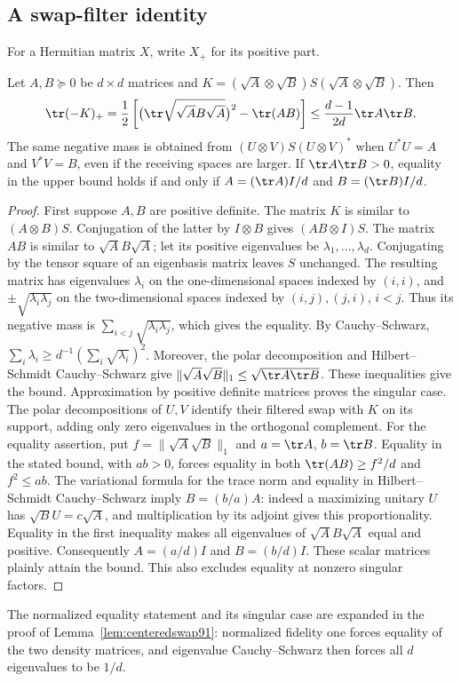 \subsection{A swap-filter identity}
For a Hermitian matrix $X$, write $X_+$ for its positive part.
\begin{lemma}\label{lem:swapfilter90}
Let $A,B\succeq0$ be $d\times d$ matrices and
$K=(\sqrt A\otimes\sqrt B)S(\sqrt A\otimes\sqrt B)$.  Then
\begin{equation}\label{eq:swapfilter90}
 \tr(-K)_+=\frac12\left[
  \bigl(\tr\sqrt{\sqrt A B\sqrt A}\bigr)^2-\tr(AB)\right]
 \le\frac{d-1}{2d}\tr A\tr B.
\end{equation}
The same negative mass is obtained from $(U\otimes V)S(U\otimes V)^*$
when $U^*U=A$ and $V^*V=B$, even if the receiving spaces are larger.
If $\tr A\tr B>0$, equality in the upper bound holds if and only if
$A=(\tr A)I/d$ and $B=(\tr B)I/d$.
\end{lemma}
\begin{proof}
First suppose $A,B$ are positive definite.  The matrix $K$ is similar
to $(A\otimes B)S$.  Conjugation of the latter by $I\otimes B$ gives
$(AB\otimes I)S$.  The matrix $AB$ is similar to $\sqrt A B\sqrt A$;
let its positive eigenvalues be $\lambda_1,\ldots,\lambda_d$.
Conjugating by the tensor square of an eigenbasis matrix leaves $S$
unchanged.  The resulting matrix has eigenvalues $\lambda_i$ on the
one-dimensional spaces indexed by $(i,i)$, and
$\pm\sqrt{\lambda_i\lambda_j}$ on the two-dimensional spaces indexed
by $(i,j),(j,i)$, $i<j$.  Thus its negative mass is
$\sum_{i<j}\sqrt{\lambda_i\lambda_j}$, which gives the equality.
By Cauchy--Schwarz,
$\sum_i\lambda_i\ge d^{-1}(\sum_i\sqrt{\lambda_i})^2$.
Moreover, the polar decomposition and Hilbert--Schmidt Cauchy--Schwarz
give $\|\sqrt A\sqrt B\|_1\le\sqrt{\tr A\tr B}$.
These inequalities give the bound.  Approximation by positive definite
matrices proves the singular case.  The polar decompositions of $U,V$
identify their filtered swap with $K$ on its support, adding only zero
eigenvalues in the orthogonal complement.
For the equality assertion, put $f=\|\sqrt A\sqrt B\|_1$ and
$a=\tr A$, $b=\tr B$.  Equality in the stated bound, with $ab>0$,
forces equality in both $\tr(AB)\ge f^2/d$ and $f^2\le ab$.
The variational formula for the trace norm and equality in
Hilbert--Schmidt Cauchy--Schwarz imply $B=(b/a)A$: indeed a maximizing
unitary $U$ has $\sqrt B U=c\sqrt A$, and multiplication by its
adjoint gives this proportionality.  Equality in the first inequality
makes all eigenvalues of $\sqrt A B\sqrt A$ equal and positive.
Consequently $A=(a/d)I$ and $B=(b/d)I$.  These scalar matrices plainly
attain the bound.  This also excludes equality at nonzero singular
factors.
\end{proof}
The normalized equality statement and its singular case are expanded
in the proof of Lemma~\ref{lem:centeredswap91}: normalized fidelity one
forces equality of the two density matrices, and eigenvalue
Cauchy--Schwarz then forces all $d$ eigenvalues to be $1/d$.


